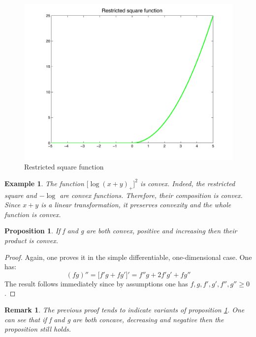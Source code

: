 \documentclass[12pt,a4paper]{article}
\newtheorem{prop}{Proposition}
\newtheorem{exmp}{Example}[section]
\newtheorem{remark}{Remark}
\begin{document}
\begin{figure}[H]
\begin{center}
\includegraphics[scale=0.5]{restrictedsquare.pdf}
\caption{Restricted square function}
\label{restricted}
\end{center}
\end{figure}

\begin{exmp}
The function $\big[ \log(x+y)_+\big]^2$ is convex. Indeed, the restricted square and $-\log$ are convex functions. Therefore, their composition is convex. Since $x+y$ is a linear transformation, it preserves convexity and the whole function is convex. 
\end{exmp}
\begin{prop}\label{product}
If f and g are both convex, positive and increasing then their product is convex.
\end{prop}
\begin{proof}
Again, one proves it in the simple differentiable, one-dimensional case. 
One has:
$$(fg)'' = \big[ f'g + fg'\big]' = f''g + 2f'g'+fg''$$
The result follows immediately since by assumptions one has $f,g,f',g',f'',g'' \geq 0$.  
\end{proof}
\begin{remark}
The previous proof tends to indicate variants of proposition \ref{product}. One can see that if f and g are both concave, decreasing and negative then the proposition still holds.  
\end{remark}
\end{document}
